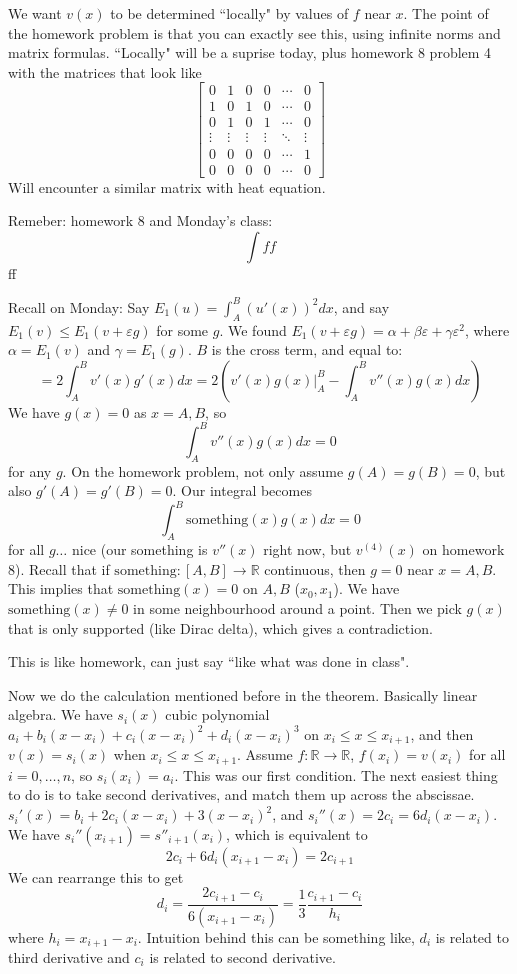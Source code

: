 \documentclass{article}
\theoremstyle{plain}
\theoremstyle{remark}
\newcommand{\R}{{\mathbb R}}
\newcommand{\ep}{{\varepsilon}}
\begin{document}
We want $v(x)$ to be determined ``locally" by values of $f$ near $x$.
The point of the homework problem is that you can exactly see this,
using infinite norms and matrix formulas.
``Locally" will be a suprise today, plus homework 8 problem 4
with the matrices that look like
\[
	\begin{bmatrix}
		0 & 1 & 0 & 0 & \cdots & 0\\
		1 & 0 & 1 & 0 & \cdots & 0\\
		0 & 1 & 0 & 1 & \cdots & 0\\
		\vdots & \vdots & \vdots & \vdots & \ddots & \vdots\\
		0 & 0 & 0 & 0 & \cdots & 1\\
		0 & 0 & 0 & 0 & \cdots & 0
	\end{bmatrix}
\]
Will encounter a similar matrix with heat equation.

Remeber: homework $8$ and Monday's class:
\[
	\int ff
\]
ff

Recall on Monday:
Say $E_1(u) = \int_A^B (u'(x))^2dx$, and say $E_1(v) \leq E_1(v + \ep g)$
for some $g$.
We found $E_1(v + \ep g) = \alpha + \beta \ep + \gamma \ep^2$,
where $\alpha = E_1(v)$ and $\gamma = E_1(g)$.
$B$ is the cross term, and equal to:
\[
	= 2\int_A^B v'(x) g'(x) dx
	= 2\left(v'(x)g(x) \bigg\vert_A^B - \int_A^B v''(x)g(x)dx\right)
\]
We have $g(x) = 0$ as $x = A,B$, so
\[
	\int_A^B v''(x) g(x)dx = 0
\]
for any $g$.
On the homework problem, not only assume $g(A) = g(B) = 0$,
but also $g'(A) = g'(B) = 0$.
Our integral becomes
\[
	\int_A^B \text{something}(x)g(x)dx = 0
\]
for all $g\dots$ nice
(our something is $v''(x)$ right now, but $v^{(4)}(x)$ on homework 8).
Recall that if $\text{something} \colon [A,B] \to \R$ continuous,
then $g = 0$ near $x = A, B$.
This implies that $\text{something}(x) = 0$ on $A,B$ ($x_0,x_1$).
We have $\text{something}(x) \neq 0$ in some neighbourhood around a point.
Then we pick $g(x)$ that is only supported (like Dirac delta),
which gives a contradiction.

This is like homework, can just say ``like what was done in class".

Now we do the calculation mentioned before in the theorem.
Basically linear algebra.
We have $s_i(x)$ cubic polynomial $a_i + b_i(x-x_i) + c_i(x-x_i)^2 + d_i(x-x_i)^3$
on $x_i \leq x \leq x_{i+1}$,
and then $v(x) = s_i(x)$ when $x_i \leq x \leq x_{i+1}$.
Assume $f \colon \R \to \R$,
$f(x_i) = v(x_i)$ for all $i = 0, \dots, n$,
so $s_i(x_i) = a_i$.
This was our first condition.
The next easiest thing to do is to take second derivatives,
and match them up across the abscissae.
$s_i'(x) = b_i + 2c_i(x-x_i) + 3(x-x_i)^2$,
and $s_i''(x) = 2c_i = 6d_i(x-x_i)$.
We have $s_i''(x_{i+1}) = s''_{i+1}(x_i)$, which is equivalent to
\[
	2c_i + 6d_i(x_{i+1} - x_i) = 2c_{i+1}
\]
We can rearrange this to get
\[
	d_i = \frac{2c_{i+1} - c_i}{6(x_{i+1} - x_i)}
	= \frac{1}{3} \frac{c_{i+1} - c_i}{h_i}
\]
where $h_i = x_{i+1} - x_i$.
Intuition behind this can be something like, $d_i$ is related to third derivative
and $c_i$ is related to second derivative.
\end{document}
